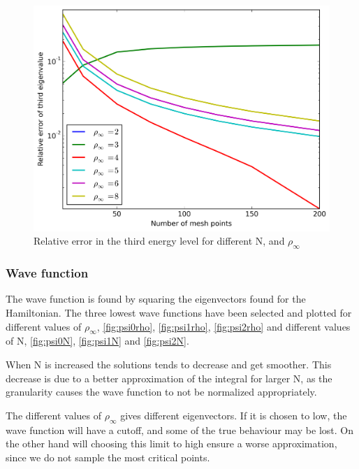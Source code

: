 \documentclass[11pt,a4paper,english,final]{article}
\numberwithin{equation}{section}
\newcommand{\figurewidth}{.85\textwidth}
\begin{document}
\begin{figure}
\centering
\includegraphics[width=\figurewidth]{../results/rel_logE2.png}
\caption{Relative error in the third energy level for different N,
and $\rho_\infty$}
\label{fig:relE2}
\end{figure}

\subsubsection{Wave function}

The wave function is found by squaring the eigenvectors found for the 
Hamiltonian. The three lowest wave functions have been selected and
plotted for different values of $\rho_\infty$,
\ref{fig:psi0rho}, \ref{fig:psi1rho}, \ref{fig:psi2rho} and 
different values of N, \ref{fig:psi0N}, \ref{fig:psi1N} and 
\ref{fig:psi2N}.

When N is increased the solutions tends to decrease and get smoother.
This decrease is due to a better approximation of the integral for 
larger N, as the granularity causes the wave function to not be normalized
appropriately.

The different values of $\rho_\infty$ gives different eigenvectors.
If it is chosen to low, the wave function will have a cutoff, and some 
of the true behaviour may be lost. On the other hand will choosing this
limit to high ensure a worse approximation, since we do not
sample the most critical points.
\end{document}
